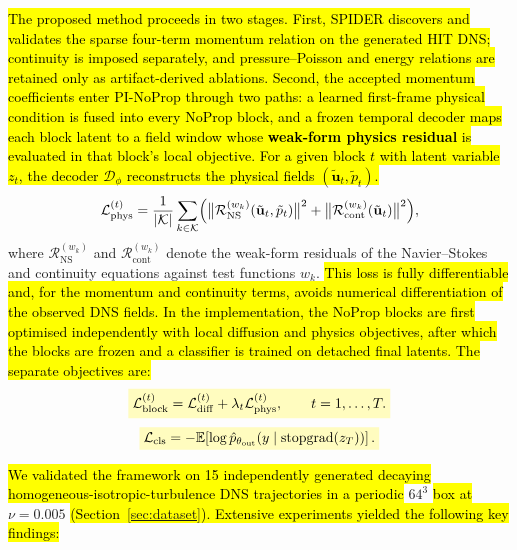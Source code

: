 \documentclass[preprint,12pt]{elsarticle}
\newcommand{\rev}[1]{\hl{#1}}
\newcommand{\revmath}[1]{\colorbox{yellow!25}{$#1$}}
\begin{document}
\rev{The proposed method proceeds in two stages. First, SPIDER discovers and validates the sparse four-term momentum relation on the generated HIT DNS; continuity is imposed separately, and pressure--Poisson and energy relations are retained only as artifact-derived ablations. Second, the accepted momentum coefficients enter PI-NoProp through two paths: a learned first-frame physical condition is fused into every NoProp block, and a frozen temporal decoder maps each block latent to a field window whose \textbf{weak-form physics residual} is evaluated in that block's local objective. For a given block $t$ with latent variable $z_t$, the decoder $\mathcal{D}_\phi$ reconstructs the physical fields $(\tilde{\mathbf{u}}_t,\tilde{p}_t)$.}
\begin{equation}
\label{eq:physics-loss-conclusion}
\mathcal{L}_{\text{phys}}^{(t)} = \frac{1}{|\mathcal{K}|}\sum_{k\in\mathcal{K}} \Bigl( \bigl\| \mathcal{R}_{\text{NS}}^{(w_k)}(\tilde{\mathbf{u}}_t,\tilde{p}_t) \bigr\|^2 + \bigl\| \mathcal{R}_{\text{cont}}^{(w_k)}(\tilde{\mathbf{u}}_t) \bigr\|^2 \Bigr),
\end{equation}
where $\mathcal{R}_{\text{NS}}^{(w_k)}$ and $\mathcal{R}_{\text{cont}}^{(w_k)}$ denote the weak-form residuals of the Navier--Stokes and continuity equations against test functions $w_k$. \rev{This loss is fully differentiable and, for the momentum and continuity terms, avoids numerical differentiation of the observed DNS fields. In the implementation, the NoProp blocks are first optimised independently with local diffusion and physics objectives, after which the blocks are frozen and a classifier is trained on detached final latents. The separate objectives are:}
\begin{equation}
\label{eq:block-loss-conclusion}
\revmath{\displaystyle \mathcal{L}_{\mathrm{block}}^{(t)}=\mathcal{L}_{\mathrm{diff}}^{(t)}+\lambda_t\mathcal{L}_{\mathrm{phys}}^{(t)},\qquad t=1,\ldots,T.}
\end{equation}
\begin{equation}
\label{eq:classifier-loss-conclusion}
\revmath{\displaystyle \mathcal{L}_{\mathrm{cls}}=-\mathbb{E}\!\left[\log\hat{p}_{\theta_{\mathrm{out}}}(y\mid\operatorname{stopgrad}(z_T))\right].}
\end{equation}

\rev{We validated the framework on 15 independently generated decaying homogeneous-isotropic-turbulence DNS trajectories in a periodic }\revmath{64^3}\rev{ box at }\revmath{\nu=0.005}\rev{ (Section~\ref{sec:dataset}). Extensive experiments yielded the following key findings:}
\end{document}
